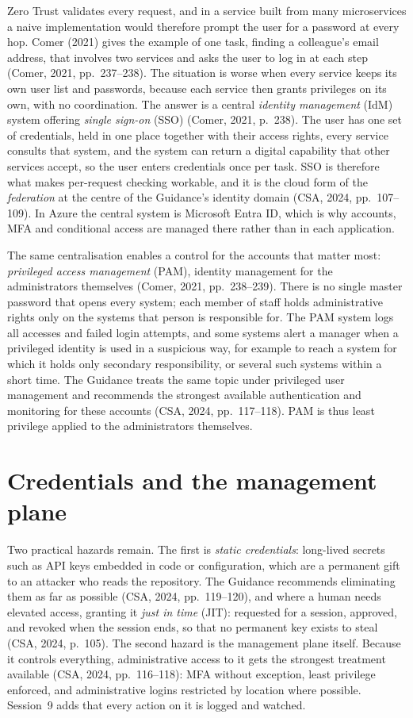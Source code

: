 Zero Trust validates every request, and in a service built from many
microservices a naive implementation would therefore prompt the user for a
password at every hop. Comer (2021) gives the example of one task, finding a
colleague's email address, that involves two services and asks the user to
log in at each step (Comer, 2021, pp.~237--238). The situation is worse when
every service keeps its own user list and passwords, because each service
then grants privileges on its own, with no coordination. The answer is a
central \emph{identity management} (IdM) system offering \emph{single
sign-on} (SSO) (Comer, 2021, p.~238). The user has one set of credentials,
held in one place together with their access rights, every service consults
that system, and the system can return a digital capability that other
services accept, so the user enters credentials once per task. SSO is
therefore what makes per-request checking workable, and it is the cloud
form of the \emph{federation} at the centre of the Guidance's identity
domain (CSA, 2024, pp.~107--109). In Azure the central system is Microsoft
Entra ID, which is why accounts, MFA and conditional access are managed
there rather than in each application.

The same centralisation enables a control for the accounts that matter
most: \emph{privileged access management} (PAM), identity management for the
administrators themselves (Comer, 2021, pp.~238--239). There is no single
master password that opens every system; each member of staff holds
administrative rights only on the systems that person is responsible for.
The PAM system logs all accesses and failed login attempts, and some systems
alert a manager when a privileged identity is used in a suspicious way, for
example to reach a system for which it holds only secondary responsibility,
or several such systems within a short time. The Guidance treats the same
topic under privileged user management and recommends the strongest
available authentication and monitoring for these accounts (CSA, 2024,
pp.~117--118). PAM is thus least privilege applied to the administrators
themselves.

\section{Credentials and the management plane}

Two practical hazards remain. The first is \emph{static credentials}:
long-lived secrets such as API keys embedded in code or configuration,
which are a permanent gift to an attacker who reads the repository. The
Guidance recommends eliminating them as far as possible (CSA, 2024,
pp.~119--120), and where a human needs elevated access, granting it
\emph{just in time} (JIT): requested for a session, approved, and revoked
when the session ends, so that no permanent key exists to steal (CSA, 2024,
p.~105). The second hazard is the management plane itself. Because it
controls everything, administrative access to it gets the strongest
treatment available (CSA, 2024, pp.~116--118): MFA without exception, least
privilege enforced, and administrative logins restricted by location where
possible. Session~9 adds that every action on it is logged and watched.

